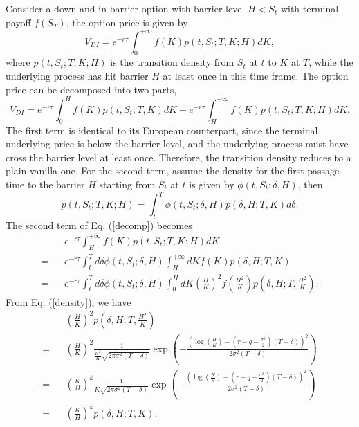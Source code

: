\documentclass[12pt]{article}
\begin{document}
  Consider a down-and-in barrier option with barrier level $H < S_t$ with terminal payoff $f(S_T)$, the option price is given by
  \begin{equation}
    V_{DI} = e^{-r\tau}\int_{0}^{+\infty}f(K)p(t,S_t;T,K; H)dK,
  \end{equation}
  where $p(t,S_t;T,K; H)$ is the transition density from $S_t$ at $t$ to $K$ at $T$, while the underlying process has hit barrier $H$ at
  least once in this time frame. The option price can be decomposed
  into two parts,
  \begin{equation}
    V_{DI} = e^{-r\tau}\int_{0}^{H}f(K)p(t,S_t;T,K)dK + e^{-r\tau}\int_{H}^{+\infty}f(K)p(t,S_t;T,K;H)dK.
    \label{decomp}
  \end{equation}
  The first term is identical to its European counterpart, since the terminal underlying price is below the barrier level, and the underlying
  process must have cross the barrier level at least once. Therefore, the transition density reduces to a plain vanilla one. For the second term,
  assume the density for the first passage time to the barrier $H$ starting from $S_t$ at $t$ is given by $\phi(t,S_t;\delta,H)$, then
  \begin{equation}
    p(t,S_t;T,K;H) = \int_t^T \phi(t,S_t;\delta,H)p(\delta,H;T,K)d\delta.
  \end{equation}
  The second term of Eq. (\ref{decomp}) becomes
  \begin{eqnarray}
      &&e^{-r\tau}\int_{H}^{+\infty}f(K)p(t,S_t;T,K;H)dK \nonumber\\
    = &&e^{-r\tau}\int_t^Td\delta \phi(t,S_t;\delta,H)\int_{H}^{+\infty}dKf(K)p(\delta,H;T,K) \nonumber\\
    = &&e^{-r\tau}\int_t^Td\delta \phi(t,S_t;\delta,H)\int_0^HdK \left(\frac{H}{K}\right)^2f\left(\frac{H^2}{K}\right)p\left(\delta,H;T,\frac{H^2}{K}\right).
  \end{eqnarray}
  From Eq. (\ref{density}), we have
  \begin{eqnarray}
      && \left(\frac{H}{K}\right)^2p\left(\delta,H;T,\frac{H^2}{K}\right) \nonumber\\
    = && \left(\frac{H}{K}\right)^2\frac{1}{\displaystyle \frac{H^2}{K}\sqrt{2\pi\sigma^2\left(T-\delta\right)}}
    \exp\left(-\frac{\displaystyle \left(\log\left(\frac{H}{K}\right)-\left(r-q-\frac{\sigma^2}{2}\right)(T-\delta)\right)^2}{2\sigma^2(T-\delta)}\right) \nonumber\\
    = && \left(\frac{K}{H}\right)^k\frac{1}{\displaystyle K\sqrt{2\pi\sigma^2\left(T-\delta\right)}}
    \exp\left(-\frac{\displaystyle \left(\log\left(\frac{K}{H}\right)-\left(r-q-\frac{\sigma^2}{2}\right)(T-\delta)\right)^2}{2\sigma^2(T-\delta)}\right) \nonumber\\
    = && \left(\frac{K}{H}\right)^kp\left(\delta,H;T,K\right),
  \end{eqnarray}
\end{document}
